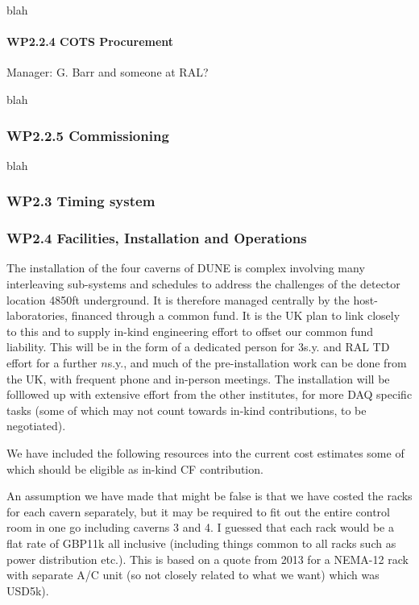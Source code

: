 \noindent
blah

\paragraph{WP2.2.4 COTS Procurement} Manager: G. Barr and someone at RAL?

\noindent
blah

\subsubsection*{WP2.2.5 Commissioning}

\noindent
blah

\subsubsection{WP2.3 Timing system}

\subsubsection{WP2.4 Facilities, Installation and Operations}

The installation of the four caverns of DUNE is complex involving many
interleaving sub-systems and schedules to address the challenges of
the detector location 4850ft underground.  It is therefore managed
centrally by the host-laboratories, financed through a common fund.
It is the UK plan to link closely to this and to supply in-kind
engineering effort to offset our common fund liability.  This will be
in the form of a dedicated person for 3s.y. and RAL TD effort for a
further $n$s.y., and much of the pre-installation work can be done from
the UK, with frequent phone and in-person meetings.  The installation
will be folllowed up with extensive effort from the other institutes,
for more DAQ specific tasks (some of which may not count towards
in-kind contributions, to be negotiated).

We have included the following resources into the current cost estimates
some of which should be eligible as in-kind CF contribution.

An assumption we have made that might be false is that we have costed the racks for each cavern separately, but it may be required to fit out the entire control room in one go including caverns 3 and 4.  I guessed that each rack would be a flat rate of GBP11k all inclusive (including things common to all racks such as power distribution etc.).  This is based on a quote from 2013 for a NEMA-12 rack with separate A/C unit (so not closely related to what we want) which was USD5k).

